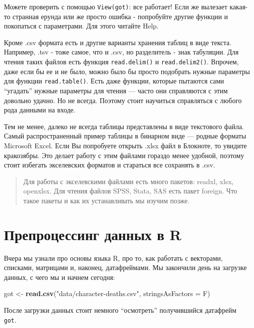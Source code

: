 \documentclass[]{book}
\newenvironment{Shaded}{\begin{snugshade}}{\end{snugshade}}
\newcommand{\DataTypeTok}[1]{\textcolor[rgb]{0.13,0.29,0.53}{#1}}
\newcommand{\KeywordTok}[1]{\textcolor[rgb]{0.13,0.29,0.53}{\textbf{#1}}}
\newcommand{\NormalTok}[1]{#1}
\newcommand{\StringTok}[1]{\textcolor[rgb]{0.31,0.60,0.02}{#1}}
\begin{document}
Можете проверить с помощью \texttt{View(got)}: все работает! Если же вылезает какая-то странная ерунда или же просто ошибка - попробуйте другие функции и покопаться с параметрами. Для этого читайте Help.

Кроме .csv формата есть и другие варианты хранения таблиц в виде текста. Например, .tsv
- тоже самое, что и .csv, но разделитель - знак табуляции. Для чтения таких файлов есть функция \texttt{read.delim()} и \texttt{read.delim2()}. Впрочем, даже если бы ее и не было, можно было бы просто подобрать нужные параметры для функции \texttt{read.table()}. Есть даже функции, которые пытаются сами ``угадать'' нужные параметры для чтения --- часто они справляются с этим довольно удачно. Но не всегда. Поэтому стоит научиться справляться с любого рода данными на входе.

Тем не менее, далеко не всегда таблицы представлены в виде текстового файла. Самый распространенный пример таблицы в бинарном виде --- родные форматы Microsoft Excel. Если Вы попробуете открыть .xlsx файл в Блокноте, то увидите кракозябры. Это делает работу с этим файлами гораздо менее удобной, поэтому стоит избегать экселевских форматов и стараться все сохранять в .csv.

\begin{quote}
Для работы с экселевскими файлами есть много пакетов: readxl, xlsx, openxlsx. Для чтения файлов SPSS, Stata, SAS есть пакет foreign. Что такое пакеты и как их устанавливать мы изучим позже.
\end{quote}

\hypertarget{prep}{%
\section{Препроцессинг данных в R}\label{prep}}

Вчера мы узнали про основы языка R, про то, как работать с векторами, списками, матрицами и, наконец, датафреймами. Мы закончили день на загрузке данных, с чего мы и начнем сегодня:

\begin{Shaded}
\begin{Highlighting}[]
\NormalTok{got <-}\StringTok{ }\KeywordTok{read.csv}\NormalTok{(}\StringTok{"data/character-deaths.csv"}\NormalTok{, }\DataTypeTok{stringsAsFactors =}\NormalTok{ F)}
\end{Highlighting}
\end{Shaded}

После загрузки данных стоит немного ``осмотреть'' получившийся датафрейм \texttt{got}.
\end{document}
